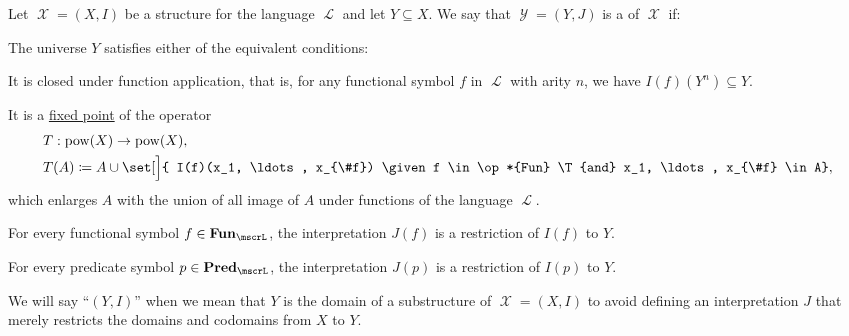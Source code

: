 \begin{definition}\label{def:first_order_substructure}
  Let \( \mscrX = (X, I) \) be a structure for the language \( \mscrL \) and let \( Y \subseteq X \). We say that \( \mscrY = (Y, J) \) is a  of \( \mscrX \) if:

  \begin{thmenum}
     The universe \( Y \) satisfies either of the equivalent conditions:

    \begin{thmenum}
       It is closed under function application, that is, for any functional symbol \( f \) in \( \mscrL \) with arity \( n \), we have \( I(f)(Y^n) \subseteq Y \).

       It is a \hyperref[def:fixed_point]{fixed point} of the operator
      \begin{equation*}
        \begin{aligned}
          &T: \pow(X) \to \pow(X), \\
          &T(A) \coloneqq A \cup \set[\Big]{ I(f)(x_1, \ldots, x_{\#f}) \given f \in \op*{Fun} \T{and} x_1, \ldots, x_{\#f} \in A},
        \end{aligned}
      \end{equation*}
      which enlarges \( A \) with the union of all image of \( A \) under functions of the language \( \mscrL \).
    \end{thmenum}

     For every functional symbol \( f \in \op*{Fun}_\mscrL \), the interpretation \( J(f) \) is a restriction of \( I(f) \) to \( Y \).

     For every predicate symbol \( p \in \op*{Pred}_\mscrL \), the interpretation \( J(p) \) is a restriction of \( I(p) \) to \( Y \).
  \end{thmenum}
\end{definition}
\begin{comments}
  \item We will say \enquote{\( (Y, I) \)} when we mean that \( Y \) is the domain of a substructure of \( \mscrX = (X, I) \) to avoid defining an interpretation \( J \) that merely restricts the domains and codomains from \( X \) to \( Y \).
\end{comments}
